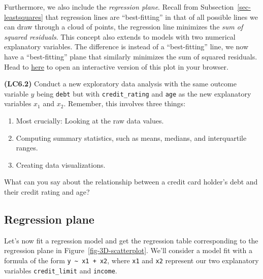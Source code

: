 \documentclass[
  letterpaper,
  DIV=11,
  numbers=noendperiod]{scrreprt}
\providecommand{\tightlist}{%
  \setlength{\itemsep}{0pt}\setlength{\parskip}{0pt}}\usepackage{longtable,booktabs,array}
\theoremstyle{definition}
\theoremstyle{remark}
\begin{document}
Furthermore, we also include the \emph{regression
plane}. Recall from
Subsection~\ref{sec-leastsquares} that regression lines are
``best-fitting'' in that of all possible lines we can draw through a
cloud of points, the regression line minimizes the \emph{sum of squared
residuals}. This concept also extends to
models with two numerical explanatory variables. The difference is
instead of a ``best-fitting'' line, we now have a ``best-fitting'' plane
that similarly minimizes the sum of squared residuals. Head to
\href{https://beta.rstudioconnect.com/connect/\#/apps/3214/}{here} to
open an interactive version of this plot in your browser.

\begin{tcolorbox}[enhanced jigsaw, coltitle=black, toprule=.15mm, bottomtitle=1mm, breakable, leftrule=.75mm, title={{🎯} Learning Check 6.1}, opacitybacktitle=0.6, colback=white, rightrule=.15mm, opacityback=0, toptitle=1mm, colbacktitle=quarto-callout-tip-color!10!white, colframe=quarto-callout-tip-color-frame, titlerule=0mm, arc=.35mm, bottomrule=.15mm, left=2mm]
\textbf{(LC6.2)} Conduct a new exploratory data analysis with the same
outcome variable \(y\) being \texttt{debt} but with
\texttt{credit\_rating} and \texttt{age} as the new explanatory
variables \(x_1\) and \(x_2\). Remember, this involves three things:

\begin{enumerate}
\def\labelenumi{\arabic{enumi}.}
\tightlist
\item
  Most crucially: Looking at the raw data values.
\item
  Computing summary statistics, such as means, medians, and
  interquartile ranges.
\item
  Creating data visualizations.
\end{enumerate}

What can you say about the relationship between a credit card holder's
debt and their credit rating and age?
\end{tcolorbox}

\hypertarget{sec-model3table}{%
\subsection{Regression plane}\label{sec-model3table}}

Let's now fit a regression model and get the regression table
corresponding to the regression plane in
Figure~\ref{fig-3D-scatterplot}. We'll consider a model fit with a
formula of the form \texttt{y\ \textasciitilde{}\ x1\ +\ x2}, where
\texttt{x1} and \texttt{x2} represent our two explanatory variables
\texttt{credit\_limit} and \texttt{income}.
\end{document}
